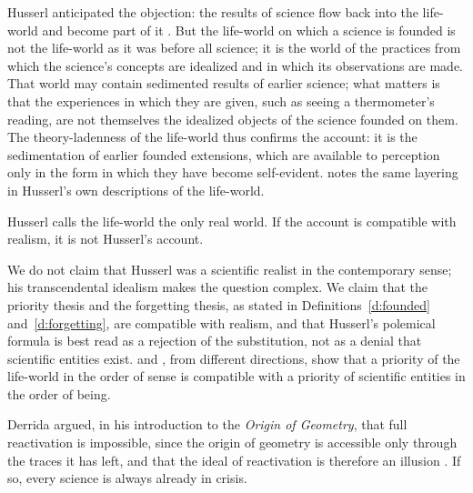 \documentclass{situationist-preprint}
\begin{document}
\begin{reply}
Husserl anticipated the objection: the results of science flow back into the life-world and become part of it \citep[§34]{Husserl1954}. But the life-world on which a science is founded is not the life-world as it was before all science; it is the world of the practices from which the science's concepts are idealized and in which its observations are made. That world may contain sedimented results of earlier science; what matters is that the experiences in which they are given, such as seeing a thermometer's reading, are not themselves the idealized objects of the science founded on them. The theory-ladenness of the life-world thus confirms the account: it is the sedimentation of earlier founded extensions, which are available to perception only in the form in which they have become self-evident. \citet{Moran2012} notes the same layering in Husserl's own descriptions of the life-world.
\end{reply}

\begin{objection}
Husserl calls the life-world the only real world. If the account is compatible with realism, it is not Husserl's account.
\end{objection}

\begin{reply}
We do not claim that Husserl was a scientific realist in the contemporary sense; his transcendental idealism makes the question complex. We claim that the priority thesis and the forgetting thesis, as stated in Definitions~\ref{d:founded} and~\ref{d:forgetting}, are compatible with realism, and that Husserl's polemical formula is best read as a rejection of the substitution, not as a denial that scientific entities exist. \citet{Gurwitsch1974} and \citet{Sellars1962}, from different directions, show that a priority of the life-world in the order of sense is compatible with a priority of scientific entities in the order of being.
\end{reply}

\begin{objection}
Derrida argued, in his introduction to the \emph{Origin of Geometry}, that full reactivation is impossible, since the origin of geometry is accessible only through the traces it has left, and that the ideal of reactivation is therefore an illusion \citep{Derrida1962}. If so, every science is always already in crisis.
\end{objection}
\end{document}
